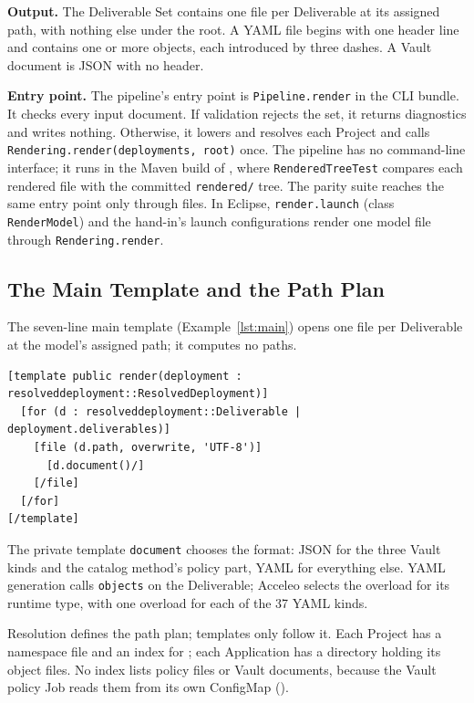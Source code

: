 \textbf{Output.} The Deliverable Set contains one file per Deliverable at its
assigned path, with nothing else under the root. A YAML file begins with one header line and contains
one or more objects, each introduced by three dashes. A Vault document is JSON with no
header.

\textbf{Entry point.} The pipeline's entry point is \texttt{Pipeline.render} in the CLI bundle. It
checks every input document. If validation rejects the set, it returns
diagnostics and writes nothing. Otherwise, it lowers and resolves each Project and calls
\texttt{Rendering.render(deployments, root)} once. The pipeline has no command-line interface; it runs
in the Maven build of , where \texttt{RenderedTreeTest} compares each
rendered file with the committed \texttt{rendered/} tree. The parity suite reaches the same entry point only through files.
In Eclipse, \texttt{render.launch} (class \texttt{RenderModel}) and the hand-in's launch
configurations render one model file through \texttt{Rendering.render}.

\subsection{The Main Template and the Path Plan}
\label{sec:m2t-main}

The seven-line main template (Example~\ref{lst:main}) opens one file per
Deliverable at the model's assigned path; it computes no paths.

\begin{lstlisting}[style=report, language=acceleo, caption={The Main Template}, label={lst:main}]
[template public render(deployment : resolveddeployment::ResolvedDeployment)]
  [for (d : resolveddeployment::Deliverable | deployment.deliverables)]
    [file (d.path, overwrite, 'UTF-8')]
      [d.document()/]
    [/file]
  [/for]
[/template]
\end{lstlisting}

The private template \texttt{document} chooses the format: JSON for the three Vault
kinds and the catalog method's policy part, YAML for everything else. YAML generation
calls \texttt{objects} on the Deliverable; Acceleo selects the overload for its
runtime type, with one overload for each of the 37 YAML kinds.

Resolution defines the path plan; templates only follow it. Each Project has
a namespace file and an index for ; each
Application has a directory holding its object files.
No index lists policy files or Vault documents, because the
Vault policy Job reads them from its own ConfigMap
().

